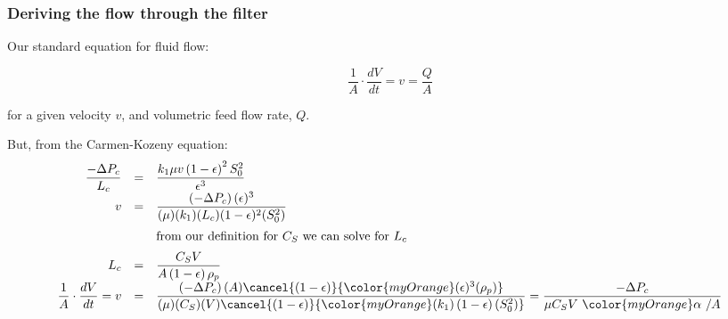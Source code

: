 \begin{frame}\frametitle{Deriving the flow through the filter}
	Our standard equation for fluid flow:
	\begin{exampleblock}{}
		\[\dfrac{1}{A} \cdot \dfrac{dV}{dt} = v = \dfrac{Q}{A}\]
	\end{exampleblock}	
	for a given velocity $v$, and volumetric feed flow rate, $Q$.
	
	\vspace{12pt}
	But, from the Carmen-Kozeny equation:
	\[
		\begin{array}{rcl}
			\dfrac{-\Delta P_c}{L_c} &=& \dfrac{k_1  \mu  v \left(1-\epsilon\right)^2 S_0^2}{\epsilon^3}\\
			\vspace{6pt}
			v &=& \dfrac{\left(-\Delta P_c\right) (\epsilon)^3}{(\mu) (k_1) (L_c)  (1-\epsilon)^2 (S_0^2)}\\
			
			\vspace{6pt}
			&&\text{from our definition for $C_S$ we can solve for $L_c$} \\
			L_c &=&  \dfrac{C_S V}{A \left(1-\epsilon\right)\rho_p}\\
			\vspace{6pt}
			\dfrac{1}{A} \cdot \dfrac{dV}{dt} = v &=& \dfrac{\left(-\Delta P_c\right) (A) \cancel{\left(1-\epsilon\right)} {\color{myOrange}(\epsilon)^3 (\rho_p)}}{(\mu) (C_S) (V) \cancel{\left(1-\epsilon\right)} {\color{myOrange}(k_1) \left(1-\epsilon\right) (S_0^2)}} 
			= \dfrac{-\Delta P_c}{\mu C_S V \,\, {\color{myOrange}\mathbf{ \alpha}}\,\,/ A} 
		\end{array}
	\]
\end{frame}

